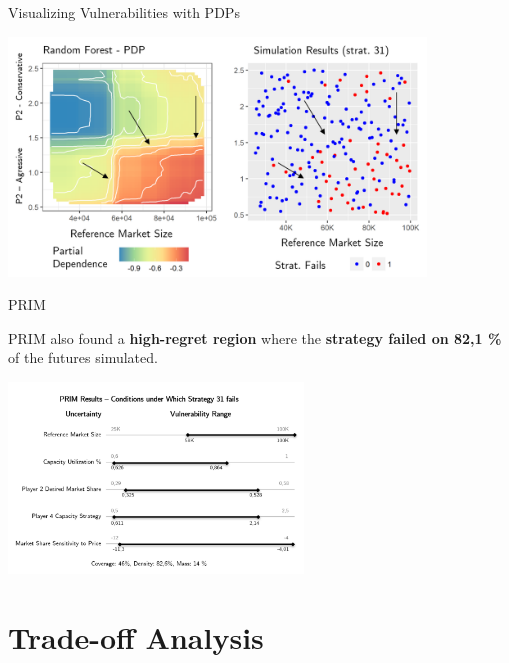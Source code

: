 \documentclass[12pt,ignorenonframetext,]{beamer}
\begin{document}
\begin{frame}{Visualizing Vulnerabilities with PDPs}
\protect\hypertarget{visualizing-vulnerabilities-with-pdps}{}

\centerline{\includegraphics[height=2.5in]{images/pdp-plot.png}}

\end{frame}

\begin{frame}{PRIM}
\protect\hypertarget{prim}{}

PRIM also found a \textbf{high-regret region} where the \textbf{strategy
failed on 82,1 \%} of the futures simulated.

\centerline{\includegraphics[height=2in]{images/prim-results.png}}

\end{frame}

\hypertarget{trade-off-analysis}{%
\section{Trade-off Analysis}\label{trade-off-analysis}}
\end{document}
